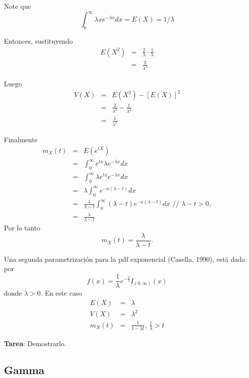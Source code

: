 \begin{i}
Note que
\begin{equation*}
\int_{0}^{\infty }\lambda xe^{-\lambda x}dx=E(X)=1/\lambda
\end{equation*}

Entonces, sustituyendo
\begin{eqnarray*}
E(X^{2}) &=&\frac{2}{\lambda }\cdot \frac{1}{\lambda } \\
&=&\frac{2}{\lambda ^{2}}
\end{eqnarray*}

Luego 
\begin{eqnarray*}
V(X) &=&E(X^{2})-\left[ E(X)\right] ^{2} \\
&=&\frac{2}{\lambda ^{2}}-\frac{1}{\lambda ^{2}} \\
&=&\frac{1}{\lambda ^{2}}
\end{eqnarray*}

Finalmente 
\begin{eqnarray*}
m_{X}(t) &=&E(e^{tX}) \\
&=&\int_{0}^{\infty }e^{tx}\lambda e^{-\lambda x}dx \\
&=&\int_{0}^{\infty }\lambda e^{tx}e^{-\lambda x}dx \\
&=&\lambda \int_{0}^{\infty }e^{-x(\lambda -t)}dx \\
&=&\frac{\lambda }{\lambda -t}\int_{0}^{\infty }\left( \lambda -t\right)
e^{-x(\lambda -t)}dx\text{ // }\lambda -t>0, \\
&=&\frac{\lambda }{\lambda -t}
\end{eqnarray*}
Por lo tanto 
\begin{equation*}
m_{X}(t)=\frac{\lambda }{\lambda -t}.
\end{equation*}

Una segunda parametrización para la pdf exponencial (Casella, 1990), está dada por
\begin{equation*}
f(x)=\frac{1}{\lambda }e^{-\frac{x}{\lambda }}I_{(0,\infty )}(x)
\end{equation*}%
donde $\lambda >0.$ En este caso 
\begin{eqnarray*}
E(X) &=&\lambda \\
V(X) &=&\lambda ^{2} \\
m_{X}(t) &=&\frac{1}{1-\lambda t}\text{, }\frac{1}{\lambda }>t
\end{eqnarray*}

\textbf{Tarea}: Demostrarlo.



\subsection{Gamma}



\end{i}
